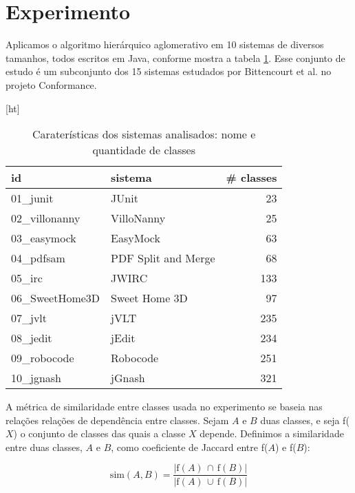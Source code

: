 
\section{Experimento} \label{sec:experimento}

Aplicamos o algoritmo hierárquico aglomerativo em 10 sistemas de diversos 
tamanhos, todos escritos em Java, conforme mostra a tabela \ref{tbl:sistemas}. 
Esse conjunto de estudo é um subconjunto dos 15 sistemas estudados por 
Bittencourt et al. no projeto Conformance.

\begin{table} \label{tbl:sistemas}[ht]
  \caption{Caraterísticas dos sistemas analisados: nome e quantidade de classes}
  \centering
  \begin{tabular}{l l r}
  \hline
  id & sistema & \# classes \\
  \hline 
  01\_junit       & JUnit               & 23  \\
  02\_villonanny  & VilloNanny          & 25  \\
  03\_easymock    & EasyMock            & 63  \\
  04\_pdfsam      & PDF Split and Merge & 68  \\
  05\_irc         & JWIRC               & 133 \\
  06\_SweetHome3D & Sweet Home 3D       & 97  \\
  07\_jvlt        & jVLT                & 235 \\
  08\_jedit       & jEdit               & 234 \\
  09\_robocode    & Robocode            & 251 \\
  10\_jgnash      & jGnash              & 321 \\
  \hline
  \end{tabular}
\end{table}

A métrica de similaridade entre classes usada no experimento se baseia nas
relações relações de dependência entre classes. 
Sejam $A$ e $B$ duas classes, e seja f($X$) o conjunto de classes das quais a 
classe $X$ depende. Definimos a similaridade entre duas classes, $A$ e $B$, 
como coeficiente de Jaccard entre f($A$) e f($B$):

\begin{equation}
\label{eq:jaccard}
\mathrm{sim}(A, B) = \frac{|\mathrm{f}(A) \, \cap \, \mathrm{f}(B)|}
                          {|\mathrm{f}(A) \, \cup \, \mathrm{f}(B)|}
\end{equation}

